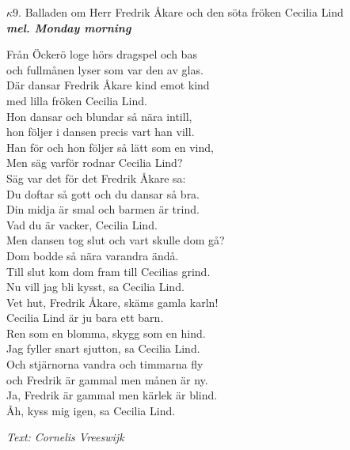 \documentclass[a6paper,10pt]{article}
\newcommand{\mel}[1]{\small\textbf{\textit{mel. #1 \\}}}
\begin{document}
\setlength{\oddsidemargin}{-0.37in}
\noindent
\begin{center}
\Large $\kappa9$. Balladen om Herr Fredrik Åkare och den söta fröken Cecilia Lind\\ 
\mel{Monday morning}
\end{center}
Från Öckerö loge hörs dragspel och bas\\
och fullmånen lyser som var den av glas.\\
Där dansar Fredrik Åkare kind emot kind\\
med lilla fröken Cecilia Lind.
\vspace{5pt}\\
Hon dansar och blundar så nära intill,\\
hon följer i dansen precis vart han vill.\\
Han för och hon följer så lätt som en vind,\\
Men säg varför rodnar Cecilia Lind?
\vspace{5pt}\\
Säg var det för det Fredrik Åkare sa:\\
Du doftar så gott och du dansar så bra.\\
Din midja är smal och barmen är trind.\\
Vad du är vacker, Cecilia Lind.
\vspace{5pt}\\
Men dansen tog slut och vart skulle dom gå?\\
Dom bodde så nära varandra ändå.\\
Till slut kom dom fram till Cecilias grind.\\
Nu vill jag bli kysst, sa Cecilia Lind.
\vspace{5pt}\\
Vet hut, Fredrik Åkare, skäms gamla karln!\\
Cecilia Lind är ju bara ett barn.\\
Ren som en blomma, skygg som en hind.\\
Jag fyller snart sjutton, sa Cecilia Lind.
\vspace{5pt}\\
Och stjärnorna vandra och timmarna fly\\
och Fredrik är gammal men månen är ny.\\
Ja, Fredrik är gammal men kärlek är blind.\\
Åh, kyss mig igen, sa Cecilia Lind.
\begin{flushright}
\textit{Text: Cornelis Vreeswijk}
\end{flushright}
\end{document}
